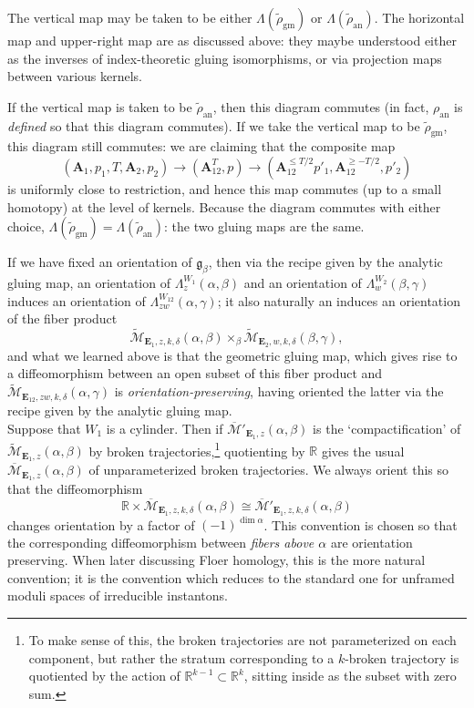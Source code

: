 \documentclass{memo-l}
\theoremstyle{definition}
\theoremstyle{remark}
\numberwithin{section}{chapter}
\numberwithin{equation}{chapter}
\begin{document}
The vertical map may be taken to be either $\Lambda(\widetilde{\rho}_{\text{gm}})$ or $\Lambda(\widetilde{\rho}_{\text{an}})$. The horizontal map and upper-right map are as discussed above: they maybe understood either as the inverses of index-theoretic gluing isomorphisms, or via projection maps between various kernels.

If the vertical map is taken to be $\widetilde{\rho}_{\text{an}}$, then this diagram commutes (in fact, $\rho_{\text{an}}$ is \textit{defined} so that this diagram commutes). If we take the vertical map to be $\widetilde{\rho}_{\text{gm}}$, this diagram still commutes: we are claiming that the composite map 
$$(\mathbf{A}_1, p_1, T, \mathbf{A}_2, p_2) \to (\mathbf{A}_{12}^T, p) \to (\mathbf{A}_{12}^{\leq T/2} p'_1, \mathbf{A}_{12}^{\geq -T/2}, p'_2)$$ 
is uniformly close to restriction, and hence this map commutes (up to a small homotopy) at the level of kernels. Because the diagram commutes with either choice, $\Lambda(\widetilde \rho_{\text{gm}}) = \Lambda(\widetilde \rho_{\text{an}})$: the two gluing maps are the same.

If we have fixed an orientation of $\mathfrak g_\beta$, then via the recipe given by the analytic gluing map, an orientation of $\Lambda_z^{W_1}(\alpha, \beta)$ and an orientation of $\Lambda_w^{W_2}(\beta, \gamma)$ induces an orientation of $\Lambda_{zw}^{W_{12}}(\alpha, \gamma)$; it also naturally an induces an orientation of the fiber product 
$$\widetilde{\mathcal M}_{\mathbf{E}_1, z, k, \delta}(\alpha, \beta) \times_\beta \widetilde{\mathcal M}_{\mathbf{E}_2, w, k, \delta}(\beta, \gamma),$$ 
and what we learned above is that the geometric gluing map, which gives rise to a diffeomorphism between an open subset of this fiber product and $\widetilde{\mathcal M}_{\mathbf{E}_{12}, zw, k, \delta}(\alpha, \gamma)$ is \emph{orientation-preserving}, having oriented the latter via the recipe given by the analytic gluing map.\\

Suppose that $W_1$ is a cylinder. Then if $\overline{\mathcal M}'_{\mathbf{E}_1, z}(\alpha, \beta)$ is the `compactification' of $\widetilde{\mathcal M}_{\mathbf{E}_1, z}(\alpha, \beta)$ by broken trajectories,\footnote{To make sense of this, the broken trajectories are not parameterized on each component, but rather the stratum corresponding to a $k$-broken trajectory is quotiented by the action of $\mathbb R^{k-1} \subset \mathbb R^k$, sitting inside as the subset with zero sum.} quotienting by $\mathbb R$ gives the usual $\overline{\mathcal M}_{\mathbf{E}_1, z}(\alpha, \beta)$ of unparameterized broken trajectories. We always orient this so that the diffeomorphism $$\mathbb R \times \overline{\mathcal M}_{\mathbf{E}_1, z, k,\delta}(\alpha, \beta) \cong \overline{\mathcal M}'_{\mathbf{E}_1, z, k,\delta}(\alpha, \beta)$$ changes orientation by a factor of $(-1)^{\dim \alpha}$. This convention is chosen so that the corresponding diffeomorphism between \emph{fibers above $\alpha$} are orientation preserving. When later discussing Floer homology, this is the more natural convention; it is the convention which reduces to the standard one for unframed moduli spaces of irreducible instantons.\\
\end{document}
